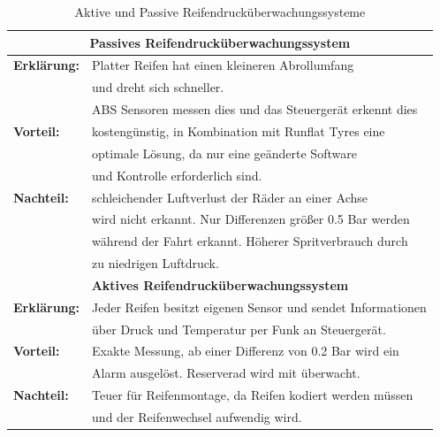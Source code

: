 \begin{flushleft}
\begin{table}
\begin{tabularx}{\textwidth} {l|l}
	                        
	                        \multicolumn{2}{c}{\textbf{Passives Reifendrucküberwachungssystem}}\\
	                        \hline
	                        \textbf{Erklärung:} & Platter Reifen hat einen kleineren Abrollumfang \\ & und dreht sich schneller.\\ & ABS Sensoren messen dies und das Steuergerät erkennt dies\\
	                        \hline
	                        \textbf{Vorteil:} & kostengünstig, in Kombination mit Runflat Tyres eine \\ & optimale Lösung, da nur eine geänderte Software \\ & und Kontrolle erforderlich sind.\\
	                        \hline
	                        \textbf{Nachteil:} & schleichender Luftverlust der Räder an einer Achse \\ &  wird nicht erkannt. Nur Differenzen größer 0.5 Bar werden \\ & während der Fahrt erkannt. Höherer Spritverbrauch durch \\ & zu niedrigen Luftdruck.\\
	                        \multicolumn{2}{c}{\textbf{Aktives Reifendrucküberwachungssystem}}\\
	                        \hline
	                        \textbf{Erklärung:} & Jeder Reifen besitzt eigenen Sensor und sendet Informationen \\ & über Druck und Temperatur per Funk an Steuergerät.\\
	                        \hline
	                        \textbf{Vorteil:} & Exakte Messung, ab einer Differenz von 0.2 Bar wird ein \\ & Alarm ausgelöst. Reserverad wird mit überwacht.\\
	                        \hline
	                        \textbf{Nachteil:}  & Teuer für Reifenmontage, da Reifen kodiert werden müssen\\ & und der Reifenwechsel aufwendig wird.\\
	
	                    \end{tabularx}
	                    \caption{Aktive und Passive Reifendrucküberwachungssysteme \cite{TS_rdks}}
	                    \label{fig:TS08}
	
	                \end{table}
	

\end{flushleft}
